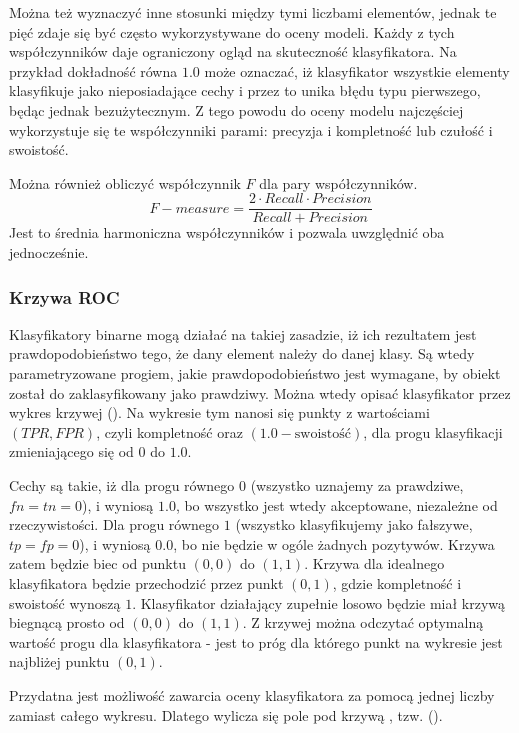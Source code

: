 Można też wyznaczyć inne stosunki między tymi liczbami elementów,
jednak te pięć zdaje się być często wykorzystywane do oceny modeli.
Każdy z tych współczynników daje ograniczony ogląd na skuteczność
klasyfikatora. Na przykład dokładność równa $1.0$ może oznaczać,
iż klasyfikator wszystkie elementy klasyfikuje jako nieposiadające
cechy i przez to unika błędu typu pierwszego, będąc jednak bezużytecznym.
Z tego powodu do oceny modelu najczęściej wykorzystuje się te
współczynniki parami: precyzja i kompletność lub czułość i swoistość.

Można również obliczyć współczynnik $F$ dla pary współczynników.
$$\mathit{F{-}measure} = \frac{2 \cdot Recall \cdot Precision}{Recall + Precision}$$
Jest to średnia harmoniczna współczynników i pozwala uwzględnić oba jednocześnie.

\subsubsection{Krzywa ROC}

Klasyfikatory binarne mogą działać na takiej zasadzie, iż ich rezultatem jest prawdopodobieństwo
tego, że dany element należy do danej klasy. Są wtedy parametryzowane progiem,
jakie prawdopodobieństwo jest wymagane, by obiekt został do zaklasyfikowany jako prawdziwy.
Można wtedy opisać klasyfikator przez wykres krzywej 
(). Na wykresie tym nanosi się punkty z wartościami
$(\mathit{TPR}, \mathit{FPR})$, czyli kompletność oraz $(1.0 - \text{swoistość})$, dla progu klasyfikacji
zmieniającego się od $0$ do $1.0$.

Cechy  są takie, iż dla progu równego $0$ (wszystko uznajemy za prawdziwe, $fn = tn = 0$),
 i 
wyniosą $1.0$, bo wszystko jest wtedy akceptowane, niezależne od rzeczywistości.
Dla progu równego $1$ (wszystko klasyfikujemy jako fałszywe, $tp = fp = 0$),
 i  wyniosą $0.0$, bo nie będzie w ogóle żadnych pozytywów.
Krzywa zatem będzie biec od punktu $(0, 0)$ do $(1, 1)$. Krzywa dla idealnego klasyfikatora
będzie przechodzić przez punkt $(0, 1)$, gdzie kompletność i swoistość wynoszą $1$. Klasyfikator
działający zupełnie losowo będzie miał krzywą biegnącą prosto od $(0, 0)$ do $(1, 1)$. Z krzywej
 można odczytać optymalną wartość progu dla klasyfikatora - jest to próg dla którego punkt
na wykresie jest najbliżej punktu $(0, 1)$.

Przydatna jest możliwość zawarcia oceny klasyfikatora za pomocą jednej liczby zamiast całego wykresu.
Dlatego wylicza się pole pod krzywą , tzw.  ().

